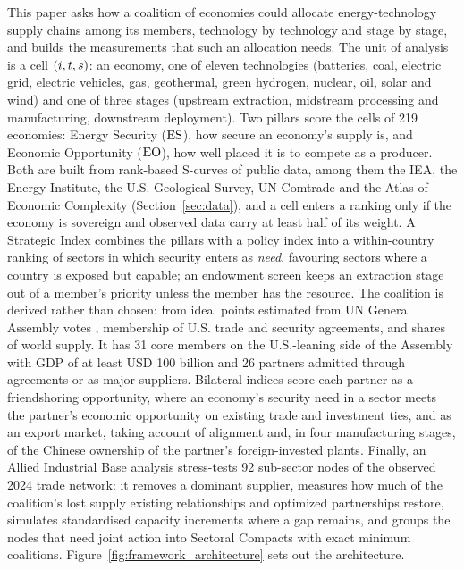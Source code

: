 This paper asks how a coalition of economies could allocate energy-technology supply chains
among its members, technology by technology and stage by stage, and builds the measurements that
such an allocation needs. The unit of analysis is a cell $(i,t,s)$: an economy, one of eleven
technologies (batteries, coal, electric grid, electric vehicles, gas, geothermal, green hydrogen,
nuclear, oil, solar and wind) and one of three stages (upstream extraction, midstream processing
and manufacturing, downstream deployment). Two pillars score the cells of 219 economies: Energy
Security ($\mathrm{ES}$), how secure an economy's supply is, and Economic Opportunity ($\mathrm{EO}$), how well
placed it is to compete as a producer. Both are built from rank-based S-curves of public data,
among them the IEA, the Energy Institute, the U.S. Geological Survey, UN Comtrade and the Atlas
of Economic Complexity (Section~\ref{sec:data}), and a cell
enters a ranking only if the economy is sovereign and observed data carry at least half of its
weight. A Strategic Index combines the pillars with a policy index into a within-country ranking
of sectors in which security enters as \emph{need}, favouring sectors where a country is exposed
but capable; an endowment screen keeps an extraction stage out of a member's priority unless the
member has the resource. The coalition is derived rather than chosen: from ideal points estimated
from UN General Assembly votes \citep{bailey2017estimating}, membership of U.S. trade and security
agreements, and shares of world supply. It has 31 core members on the U.S.-leaning side of the
Assembly with GDP of at least USD 100 billion and 26 partners admitted through agreements or as
major suppliers. Bilateral indices
score each partner as a friendshoring opportunity, where an economy's security need in a sector
meets the partner's economic opportunity on existing trade and investment ties, and as an export
market, taking account of alignment and, in four manufacturing stages, of the Chinese ownership of
the partner's foreign-invested plants. Finally,
an Allied Industrial Base analysis stress-tests 92 sub-sector nodes of the observed 2024 trade
network: it removes a dominant supplier, measures how much of the coalition's lost supply existing
relationships and optimized partnerships restore, simulates standardised capacity increments where
a gap remains, and groups the nodes that need joint action into Sectoral Compacts with exact
minimum coalitions. Figure~\ref{fig:framework_architecture}
sets out the architecture.

